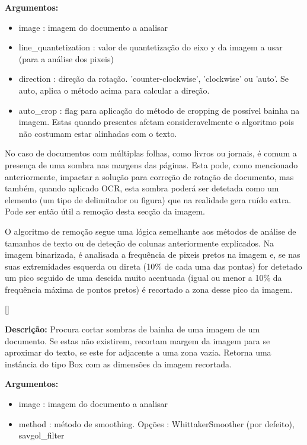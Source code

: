\textbf{Argumentos:}
\begin{itemize}\setlength\itemsep{-0.3em}
	\item image : imagem do documento a analisar
	\item line\_quantetization : valor de quantetização do eixo y da imagem a usar (para a análise dos pixeis) 
	\item direction : direção da rotação. 'counter-clockwise', 'clockwise' ou 'auto'. Se auto, aplica o método acima para calcular a direção.
	\item auto\_crop : flag para aplicação do método de cropping de possível bainha na imagem. Estas quando presentes afetam consideravelmente o algoritmo pois não costumam estar alinhadas com o texto.
\end{itemize}

\label{contribution_image_cut_argin_shadow}

No caso de documentos com múltiplas folhas, como livros ou jornais, é comum a presença de uma sombra nas margens das páginas. Esta pode, como mencionado anteriormente, impactar a solução para correção de rotação de documento, mas também, quando aplicado OCR, esta sombra poderá ser detetada como um elemento (um tipo de delimitador ou figura) que na realidade gera ruído extra. Pode ser então útil a remoção desta secção da imagem.


O algoritmo de remoção segue uma lógica semelhante aos métodos de análise de tamanhos de texto ou de deteção de colunas anteriormente explicados. Na imagem binarizada, é analisada a frequência de pixeis pretos na imagem e, se nas suas extremidades esquerda ou direta (10\% de cada uma das pontas) for detetado um pico seguido de uma descida muito acentuada (igual ou menor a 10\% da frequência máxima de pontos pretos) é recortado a zona desse pico da imagem.

[\normalsize]

\textbf{Descrição:} Procura cortar sombras de bainha de uma imagem de um documento. Se estas não existirem, recortam margem da imagem para se aproximar do texto, se este for adjacente a uma zona vazia. Retorna uma instância do tipo Box com as dimensões da imagem recortada.

\textbf{Argumentos:}
\begin{itemize}\setlength\itemsep{-0.3em}
	\item image : imagem do documento a analisar
	\item method : método de smoothing. Opções : WhittakerSmoother (por defeito), savgol\_filter
\end{itemize}


